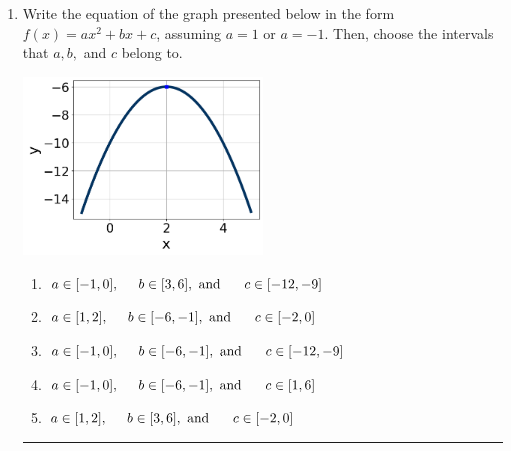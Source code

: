 \documentclass[14pt]{extbook}
\newcommand{\litem}[1]{\item#1\hspace*{-1cm}\rule{\textwidth}{0.4pt}}
\begin{document}
\begin{enumerate}
{\begin{enumerate}[label=\Alph*.]
\end{enumerate} }
\litem{
Write the equation of the graph presented below in the form $f(x)=ax^2+bx+c$, assuming  $a=1$ or $a=-1$. Then, choose the intervals that $a, b,$ and $c$ belong to.
\begin{center}
    \includegraphics[width=0.5\textwidth]{../Figures/quadraticGraphToEquationCopyA.png}
\end{center}
\begin{enumerate}[label=\Alph*.]
\item \( a \in [-1, 0], \hspace*{5mm} b \in [3, 6], \text{ and } \hspace*{5mm} c \in [-12, -9] \)
\item \( a \in [1, 2], \hspace*{5mm} b \in [-6, -1], \text{ and } \hspace*{5mm} c \in [-2, 0] \)
\item \( a \in [-1, 0], \hspace*{5mm} b \in [-6, -1], \text{ and } \hspace*{5mm} c \in [-12, -9] \)
\item \( a \in [-1, 0], \hspace*{5mm} b \in [-6, -1], \text{ and } \hspace*{5mm} c \in [1, 6] \)
\item \( a \in [1, 2], \hspace*{5mm} b \in [3, 6], \text{ and } \hspace*{5mm} c \in [-2, 0] \)


\end{enumerate}}
\end{enumerate}
\end{document}
